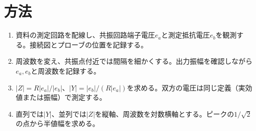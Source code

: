 \documentclass[lualatex,a4paper,10pt]{jlreq}
\begin{document}
\section{方法}\label{sec:auto4}
\begin{enumerate}
\item 資料の測定回路を配線し、共振回路端子電圧$e_a$と測定抵抗電圧$e_b$を観測する。接続図とプローブの位置を記録する。
\item 周波数を変え、共振点付近では間隔を細かくする。出力振幅を確認しながら$e_a,e_b$と周波数を記録する。
\item $|Z|=R|e_a|/|e_b|$、$|Y|=|e_b|/(R|e_a|)$を求める。双方の電圧は同じ定義（実効値または振幅）で測定する。
\item 直列では$|Y|$、並列では$|Z|$を縦軸、周波数を対数横軸とする。ピークの$1/\sqrt2$の点から半値幅を求める。
\end{enumerate}
\end{document}

